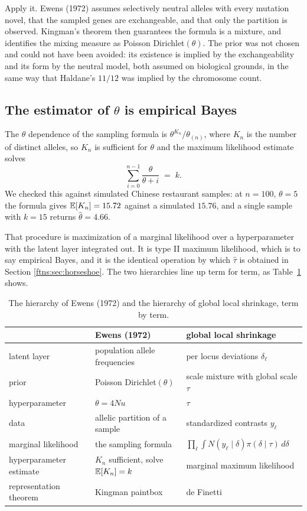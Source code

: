 Apply it. Ewens (1972) assumes selectively neutral alleles with every mutation novel, that the sampled genes are exchangeable, and that only the partition is
observed. Kingman's theorem then guarantees the formula is a mixture, and identifies the mixing
measure as Poisson Dirichlet$(\theta)$. The prior was not chosen and could not have been avoided:
its existence is implied by the exchangeability and its form by the neutral model, both assumed on biological grounds, in the same way that Haldane's
$11/12$ was implied by the chromosome count.

\subsection{The estimator of $\theta$ is empirical Bayes}

The $\theta$ dependence of the sampling formula is $\theta^{K_n}/\theta_{(n)}$, where $K_n$ is the
number of distinct alleles, so $K_n$ is sufficient for $\theta$ and the maximum likelihood estimate
solves
\[
\sum_{i=0}^{n-1}\frac{\theta}{\theta+i}\;=\;k .
\]
We checked this against simulated Chinese restaurant samples: at $n=100$, $\theta=5$ the formula
gives $\mathbb{E}[K_n]=15.72$ against a simulated $15.76$, and a single sample with $k=15$ returns
$\hat\theta=4.66$.

That procedure is maximization of a marginal likelihood over a hyperparameter with the latent layer
integrated out. It is type II maximum likelihood, which is to say empirical Bayes, and it is the
identical operation by which $\hat\tau$ is obtained in Section \ref{ftns:sec:horseshoe}. The two
hierarchies line up term for term, as Table~\ref{ftns:tab:hierarchies} shows.

\begin{table}[tp]
\centering
\begin{tabularx}{\textwidth}{l>{\raggedright\arraybackslash}X>{\raggedright\arraybackslash}X}
\toprule
& Ewens (1972) & global local shrinkage \\
\midrule
latent layer & population allele frequencies & per locus deviations $\delta_\ell$ \\
prior & Poisson Dirichlet$(\theta)$ & scale mixture with global scale $\tau$ \\
hyperparameter & $\theta=4Nu$ & $\tau$ \\
data & allelic partition of a sample & standardized contrasts $y_\ell$ \\
marginal likelihood & the sampling formula & $\prod_\ell\int N(y_\ell\mid\delta)\pi(\delta\mid\tau)\,d\delta$ \\
hyperparameter estimate & $K_n$ sufficient, solve $\mathbb{E}[K_n]=k$ & marginal maximum likelihood \\
representation theorem & Kingman paintbox & de Finetti \\
\bottomrule
\end{tabularx}
\caption{The hierarchy of Ewens (1972) and the hierarchy of global local shrinkage, term by term.}\label{ftns:tab:hierarchies}
\end{table}


